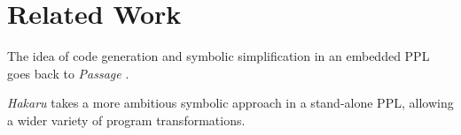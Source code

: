 \documentclass[anonymous=false, %
               format=acmsmall, %
               review=true, %
               screen=true, %
               nonacm=true]{acmart}
\begin{document}





  

  
  
  


\section{Related Work}

The idea of code generation and symbolic simplification in an embedded PPL goes back to \emph{Passage} \cite{Scherrer2012}. 

\emph{Hakaru} \cite{narayanan2016probabilistic} takes a more ambitious symbolic approach in a stand-alone PPL, allowing a wider variety of program transformations. 
\end{document}
